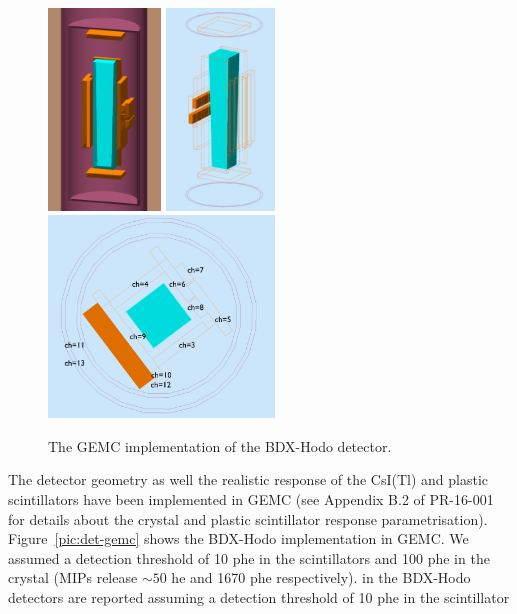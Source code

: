 \begin{figure}[h!] 
\center
\includegraphics[width=2.99cm]{figs/gemc-3d.pdf}  
\includegraphics[width=2.9cm]{figs/gemc-3d1.pdf}  
\includegraphics[width=6.0cm]{figs/gemc-3d2.pdf}  
\caption{The GEMC  implementation of the BDX-Hodo detector.}
\label{fig:det-gemc}
\end{figure}


The  detector geometry as well the realistic response of the CsI(Tl) and plastic scintillators have been implemented in GEMC (see  Appendix B.2 of PR-16-001~\cite{bdx-proposal} for details about the crystal and plastic scintillator response parametrisation). 
Figure~\ref{pic:det-gemc} shows the BDX-Hodo implementation in GEMC. 
We assumed a detection threshold of 10 phe in the scintillators and 100 phe in the crystal  (MIPs release $\sim50$ he and 1670 phe respectively). 
in the BDX-Hodo detectors are reported assuming a detection threshold of 10 phe in the scintillator 

